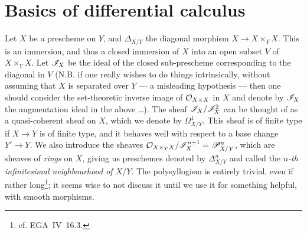 \section{Basics of differential calculus}
\label{I.1}

Let $X$ be a prescheme on $Y$, and $\Delta_{X/Y}$ the diagonal morphism $X\to X\times_Y X$.
This is an immersion, and thus a closed immersion of $X$ into an open subset $V$ of $X\times_Y X$.
Let $\scr{I}_X$ be the ideal of the closed sub-prescheme corresponding to the diagonal in $V$ (N.B. if one really wishes to do things intrinsically, without assuming that $X$ is separated over $Y$ --- a misleading hypothesis --- then one should consider the set-theoretic inverse image of $\cal{O}_{X\times X}$ in $X$ and denote by $\scr{I}_X$ the augmentation ideal in the above \ldots).
The sheaf $\scr{I}_X/\scr{I}_X^2$ can be thought of as a quasi-coherent sheaf on $X$, which we denote by $\Omega_{X/Y}^1$.
This sheaf is of finite type if $X\to Y$ is of finite type, and it behaves well with respect to a base change $Y'\to Y$.
We also introduce the sheaves $\cal{O}_{X\times_Y X}/\scr{I}_X^{n+1}=\scr{P}^n_{X/Y}$, which are sheaves of \emph{rings} on $X$, giving us preschemes denoted by $\Delta_{X/Y}^n$ and called the \emph{$n$-th infinitesimal neighbourhood of $X/Y$}.
The polysyllogism is entirely trivial, even if rather long\footnote{cf. EGA~IV~16.3.}; it seems wise to not discuss it until we use it for something helpful, with smooth morphisms.
